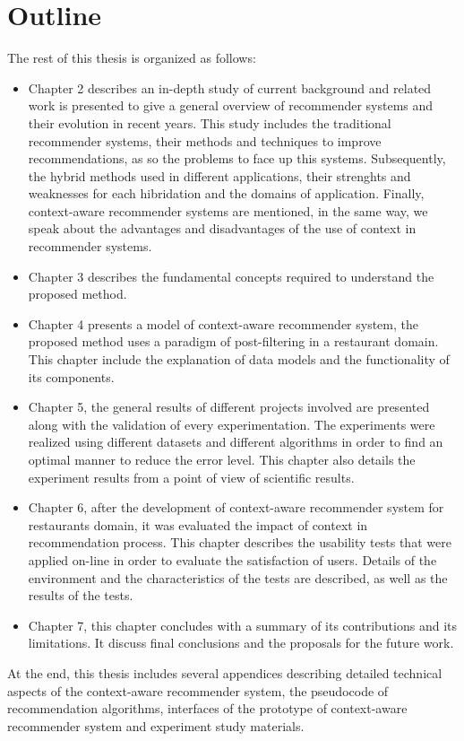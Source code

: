 \section{Outline}

The rest of this thesis is organized as follows: 
\begin{itemize}  
\item Chapter 2 describes an in-depth study of current background and
related work is presented to give a general overview of recommender
systems and their evolution in recent years. This study includes the
traditional recommender systems, their methods and techniques to
improve recommendations, as so the problems to face up this systems.
Subsequently, the hybrid methods used in different applications, their
strenghts and weaknesses for each hibridation and the domains of
application. Finally, context-aware recommender systems are mentioned,
in the same way, we speak about the advantages and disadvantages of
the use of context in recommender systems.
\item Chapter 3 describes the fundamental concepts required to
understand the proposed method.
\item Chapter 4 presents a model of context-aware recommender system,
the proposed method  uses a paradigm of post-filtering in a restaurant
domain. This chapter include the explanation of data models and the
functionality of its components.
\item Chapter 5, the general results of different projects involved
are presented along with the validation of every experimentation. The
experiments were realized using different datasets and different
algorithms in order to find an optimal manner to reduce the error
level. This chapter also details the experiment results from a point
of view  of scientific results.
\item Chapter 6, after the development of context-aware recommender
system for restaurants domain, it was evaluated the impact of context
in recommendation process. This chapter describes the usability tests
that were applied on-line in order to evaluate the satisfaction of
users. Details of the environment and the characteristics of the tests
are described, as well as the results of the tests.
\item Chapter 7, this chapter concludes with a
summary of its contributions and  its limitations. It discuss final
conclusions and the proposals for the future work.
\end{itemize}  
At the end, this thesis includes several appendices describing
detailed technical aspects of the context-aware recommender system,
the pseudocode of recommendation algorithms, interfaces of the
prototype of context-aware recommender system and experiment study
materials.



